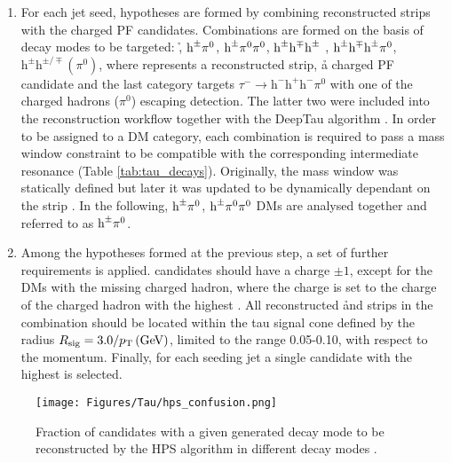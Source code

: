 \begin{enumerate}
    \item For each jet seed, \tauh hypotheses are formed by combining reconstructed strips with the charged PF candidates. Combinations are formed on the basis of decay modes to be targeted: \h, $\text{h}^\pm \pi^0$, $\text{h}^\pm \pi^0 \pi^0$, $\text{h}^\pm \text{h}^\mp \text{h}^\pm$ , $\text{h}^\pm \text{h}^\mp \text{h}^\pm \pi^0$, $\text{h}^\pm\text{h}^{\pm/\mp} (\pi^0)$, where \piz represents a reconstructed strip, \h a charged PF candidate and the last category targets $\tau^- \to \text{h}^- \text{h}^+ \text{h}^- \pi^0$ with one of the charged hadrons ($\pi^0$) escaping detection. The latter two were included into the reconstruction workflow together with the DeepTau algorithm \cite{CMS:2022prd}. In order to be assigned to a DM category, each combination is required to pass a mass window constraint to be compatible with the corresponding intermediate resonance (Table \ref{tab:tau_decays}). Originally, the mass window was statically defined but later it was updated to be dynamically dependant on the strip \pt. In the following, $\text{h}^\pm \pi^0$, $\text{h}^\pm \pi^0 \pi^0$ DMs are analysed together and referred to as $\text{h}^\pm \pi^0$. 
    \item Among the \tauh hypotheses formed at the previous step, a set of further requirements is applied. \tauh candidates should  have a charge $\pm 1$, except for the DMs with the missing charged hadron, where the \tauh charge is set to the charge of the charged hadron with the highest \pt. All reconstructed \h and strips in the combination should be located within the tau signal cone defined by the radius $R_\text{sig} = 3.0 / p_{\text{T}} \, \text{(GeV)}$, limited to the range 0.05-0.10, with respect to the \tauh momentum. Finally, for each seeding jet a single \tauh candidate with the highest \pt is selected.
    \end{enumerate}

\begin{figure}[t!]
    \centering
    \texttt{[image: Figures/Tau/hps\_confusion.png]}
    \caption{Fraction of \tauh candidates with a given generated decay mode to be reconstructed by the HPS algorithm in different decay modes \cite{CMS:2022prd}.}
    \label{fig:hps_confusion_matrix}
\end{figure}

